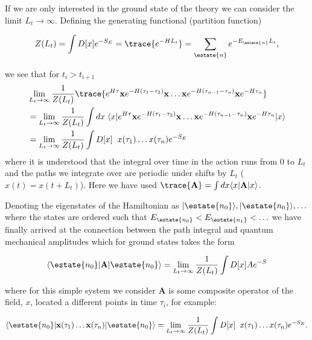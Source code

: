 If we are only interested in the ground state of the theory we can consider the limit $L_t \to \infty$. Defining the generating functional (partition function) 

\begin{equation*}
Z(L_t) = \int D[x] e^{-S_E} = \trace{e^{-HL_t}} = \sum_{\estate{n}}e^{-E_{\estate{n}}L_t},
\end{equation*}

we see that for $t_i > t_{i+1}$
\begin{align*}
&\lim_{L_t\to\infty} \frac{1}{Z(L_t)}\trace{ e^{H\tau}\mathbf{x}e^{-H(\tau_1 -\tau_2)} \mathbf{x}\ldots \mathbf{x} e^{-H(\tau_{n-1} - \tau_n)} \mathbf{x} e^{-H\tau_n }} \\
&= \lim_{L_t\to\infty} \frac{1}{Z(L_t)}\int dx \; \langle x | e^{H\tau}\mathbf{x}e^{-H(\tau_1 -\tau_2)} \mathbf{x}\ldots \mathbf{x} e^{-H(\tau_{n-1} - \tau_n)} \mathbf{x} e^{-H\tau_n } | x \rangle \\
&= \lim_{L_t\to\infty} \frac{1}{Z(L_t)}\int D[x] \;\; x(\tau_1)\ldots x(\tau_n)e^{-S_E}
\end{align*}
where it is understood that the integral over time in the action runs from $0$ to $L_t$ and the paths we integrate over are periodic under shifts by $L_t$ ($x(t) = x(t + L_t)$). Here we have used $\trace{\mathbf{A}} = \int dx \langle x | \mathbf{A} | x \rangle $. 

Denoting the eigenstates of the Hamiltonian as $|\estate{n_0}\rangle, |\estate{n_0}\rangle, \ldots $ where the states are ordered such that $E_{\estate{n_0}} < E_{\estate{n_1}} < \ldots$ we have finally arrived at the connection between the path integral and quantum mechanical amplitudes which for ground states takes the form 

\begin{equation*}
\langle \estate{n_0} | \mathbf{A} | \estate{n_0} \rangle = \lim_{L_t\to\infty} \frac{1}{Z(L_t)}\int D[x] A e^{-S}
\end{equation*}

where for this simple system we consider $\mathbf{A}$ is some composite operator of the field, $x$, located a different points in time $\tau_i$, for example: 

\begin{equation*}
\langle \estate{n_0} | \mathbf{x}(\tau_1)\ldots \mathbf{x}(\tau_n) | \estate{n_0} \rangle = \lim_{L_t\to\infty} \frac{1}{Z(L_t)}\int D[x] \;\; x(\tau_1)\ldots x(\tau_n)e^{-S_E}.
\end{equation*}

